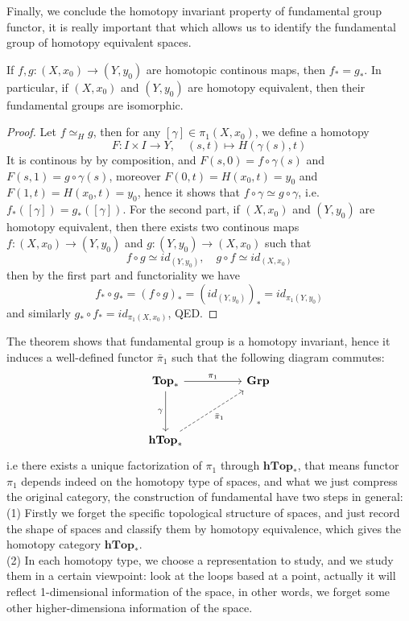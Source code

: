 Finally, we conclude the homotopy invariant property of fundamental group functor, it is really important that which allows us to identify the fundamental group of homotopy equivalent spaces.
\begin{theorem}
    If \(f,g:(X,x_0) \to (Y,y_0)\) are homotopic continous maps, then \(f_* = g_*\). In particular, if \((X,x_0)\) and \((Y,y_0)\) are homotopy equivalent, then their fundamental groups are isomorphic.
\end{theorem}
\begin{proof}
    Let \(f \simeq_H g\), then for any \([\gamma] \in \pi_1(X,x_0)\), we define a homotopy
    \[F:I \times I \to Y, \quad (s,t) \mapsto H(\gamma(s),t)\]
    It is continous by by composition, and \(F(s,0) = f\circ \gamma(s)\) and \(F(s,1) = g \circ \gamma(s)\), moreover \(F(0,t) = H(x_0,t) = y_0\) and \(F(1,t) = H(x_0,t) = y_0\), hence it shows that \(f \circ \gamma \simeq g \circ \gamma\), i.e. \(f_*([\gamma]) = g_*([\gamma])\).
    For the second part, if \((X,x_0)\) and \((Y,y_0)\) are homotopy equivalent, then there exists two continous maps \(f:(X,x_0) \to (Y,y_0)\) and \(g:(Y,y_0) \to (X,x_0)\) such that
    \[f \circ g \simeq id_{(Y,y_0)}, \quad g \circ f \simeq id_{(X,x_0)}\]
    then by the first part and functoriality we have 
    \[f_* \circ g_* = (f \circ g)_* = (id_{(Y,y_0)})_* = id_{\pi_1(Y,y_0)}\]
    and similarly \(g_* \circ f_* = id_{\pi_1(X,x_0)}\), QED.
\end{proof}

\begin{remark}
    The theorem shows that fundamental group is a homotopy invariant, hence it induces a well-defined functor \(\bar{\pi}_1\) such that the following diagram commutes:
\[\begin{tikzcd}
	{\mathbf{Top}_*} && {\mathbf{Grp}} \\
	\\
	{\mathbf{hTop}_*}
	\arrow["{\pi_1}", from=1-1, to=1-3]
	\arrow["\gamma"', from=1-1, to=3-1]
	\arrow["{\bar{\pi}_1}"', dashed, from=3-1, to=1-3]
\end{tikzcd}\]
i.e there exists a unique factorization of \(\pi_1\) through \(\mathbf{hTop}_*\), that means functor \(\pi_1\) depends indeed on the homotopy type of spaces, and what we just compress the original category, the construction of fundamental have two steps in general:
(1) Firstly we forget the specific topological structure of spaces, and just record the shape of spaces and classify them by homotopy equivalence, which gives the homotopy category \(\mathbf{hTop}_*\).\\
(2) In each homotopy type, we choose a representation to study, and we study them in a certain viewpoint: look at the loops based at a point, actually it will reflect 1-dimensional information of the space, in other words, we forget some other higher-dimensiona information of the space.\\
\end{remark}

